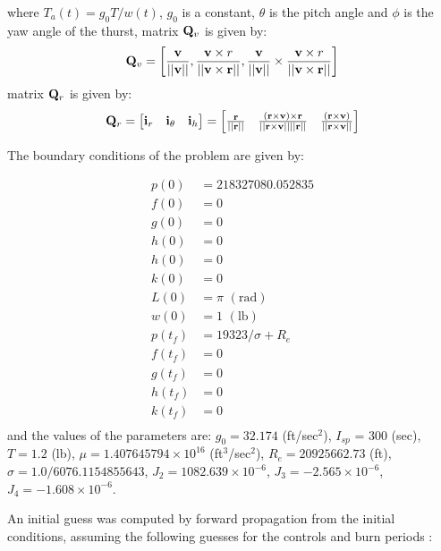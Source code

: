 \documentclass[a4paper,11pt]{report}    %
\newcommand{\mt}[1]{\ensuremath \mathbf{#1}}
\begin{document}
where $T_a(t) = g_0 T/ w(t) $, $g_0$ is a constant, $\theta$ is the pitch angle and $\phi$ is the yaw angle of the thurst, matrix $\mt{Q}_v$ is 
given by:
\begin{equation}
 \mt{Q}_v = \left[ \frac{\mt{v}}{|| \mt{v} ||}, \frac{\mt{v}\times {r}}{||\mt{v} \times \mt{r}||},  \frac{\mt{v}}{|| \mt{v} ||}\times  \frac{\mt{v}\times {r}}{||\mt{v} \times \mt{r}|| } \right]
\end{equation}
matrix $\mt{Q}_r$ is given by:
\begin{equation}
  \mt{Q}_r = \begin{bmatrix} \mt{i}_r &\mt{i}_\theta & \mt{i}_h \end{bmatrix}  = \begin{bmatrix} \frac{\mt{r}}{||\mt{r}||} &  \frac{(\mt{r}\times \mt{v})\times \mt{r}}{|| \mt{r} \times \mt{v} || || \mt{r}|| } & \frac{(\mt{r}\times \mt{v})}{|| \mt{r} \times \mt{v} || }\end{bmatrix}
\end{equation}

The boundary conditions of the problem are given by:

\begin{equation}
 \begin{aligned}
 p(0) &= 218327080.052835 \\
 f(0) &= 0 \\
 g(0) &= 0 \\
 h(0) &= 0 \\
 h(0) &= 0 \\ 
 k(0) &= 0 \\
 L(0) &= \pi \,\,(\mathrm{rad}) \\
 w(0) &= 1 \,\,(\mathrm{lb}) \\
 p(t_f) &= 19323/\sigma + R_e\\
 f(t_f) &= 0 \\
 g(t_f) &= 0 \\
 h(t_f) &= 0 \\
 k(t_f) &= 0 \\
 \end{aligned}
\end{equation}
and the values of the parameters are: $g_0 = 32.174$ (ft/sec$^2$), $I_{sp}$ = 300 (sec), 
$T = 1.2$  (lb),  $\mu = 1.407645794 \times 10^{16}$ (ft$^{3}$/sec$^{2}$),
$R_e = 20925662.73$ (ft), $\sigma = 1.0/6076.1154855643 $, $J_2 =1082.639 \times 10^{-6} $,  $J_3 =-2.565 \times 10^{-6} $,
 $J_4 =-1.608 \times 10^{-6} $.


An initial guess was computed by forward propagation from the initial conditions, assuming the following
guesses for the controls and burn periods \cite{Betts:01}:
\end{document}
